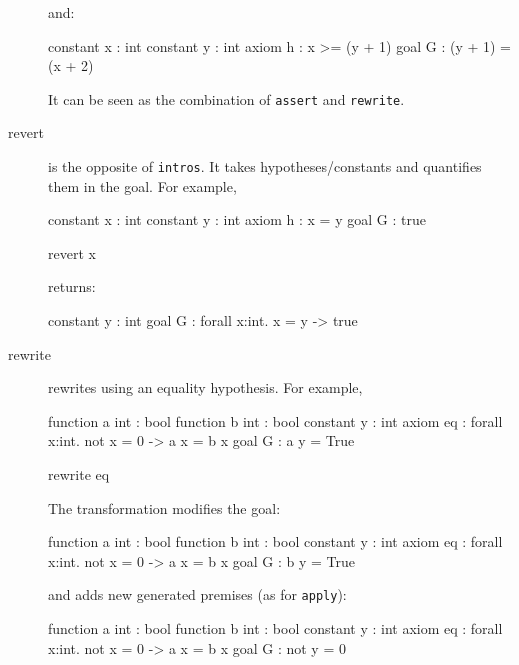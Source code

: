 \begin{description}
and:
\begin{whycode}
constant x : int
constant y : int
axiom h : x >= (y + 1)
goal G : (y + 1) = (x + 2)
\end{whycode}

It can be seen as the combination of \texttt{assert} and \texttt{rewrite}.


\item[revert] is the opposite of \texttt{intros}. It takes hypotheses/constants
  and quantifies them in the goal.
  For example,

\begin{whycode}
constant x : int
constant y : int
axiom h : x = y
goal G : true
\end{whycode}

\begin{transwhy3}
revert x
\end{transwhy3}

returns:

\begin{whycode}
constant y : int
goal G : forall x:int. x = y -> true
\end{whycode}


\item[rewrite] rewrites using an equality hypothesis.
  For example,
\begin{whycode}
function a int : bool
function b int : bool
constant y : int
axiom eq : forall x:int. not x = 0 -> a x = b x
goal G : a y = True
\end{whycode}

\begin{transwhy3}
rewrite eq
\end{transwhy3}

The transformation modifies the goal:

\begin{whycode}
function a int : bool
function b int : bool
constant y : int
axiom eq : forall x:int. not x = 0 -> a x = b x
goal G : b y = True
\end{whycode}

and adds new generated premises (as for \texttt{apply}):
\begin{whycode}
function a int : bool
function b int : bool
constant y : int
axiom eq : forall x:int. not x = 0 -> a x = b x
goal G : not y = 0
\end{whycode}



\end{description}
